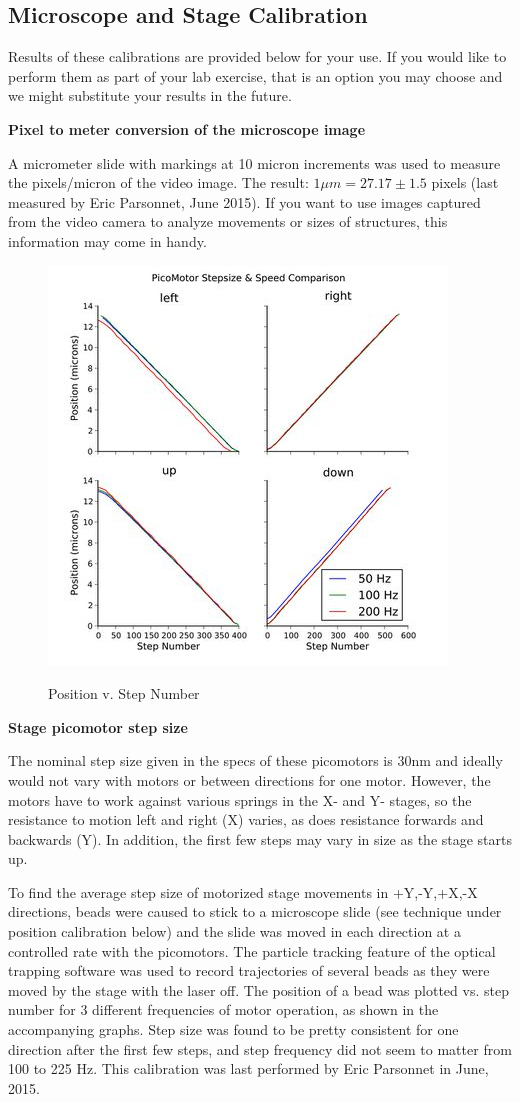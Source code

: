 \documentclass{../lab}
\begin{document}
\subsection{Microscope and Stage Calibration}

Results of these calibrations are provided below for your use. If you would like to perform them as part of your lab exercise, that is an option you may choose and we might substitute your results in the future.

\textbf{Pixel to meter conversion of the microscope image}

A micrometer slide with markings at 10 micron increments was used to measure the pixels/micron of the video image. The result: $1\mu m = 27.17 \pm 1.5$ pixels (last measured by Eric Parsonnet, June 2015). If you want to use images captured from the video camera to analyze movements or sizes of structures, this information may come in handy.

\begin{figure}[h]
    \centering
    \href{http://experimentationlab.berkeley.edu/sites/default/files/images/400px-Stepsize-ayars.jpg}{\includegraphics[width=0.5\linewidth]{images/400px-Stepsize-ayars.jpg}}
    \caption{Position v. Step Number}
    \label{fig:400px-Stepsize-ayars}
\end{figure}

\textbf{Stage picomotor step size}

The nominal step size given in the specs of these picomotors is 30nm and ideally would not vary with motors or between directions for one motor. However, the motors have to work against various springs in the X- and Y- stages, so the resistance to motion left and right (X) varies, as does resistance forwards and backwards (Y). In addition, the first few steps may vary in size as the stage starts up.

To find the average step size of motorized stage movements in +Y,-Y,+X,-X directions, beads were caused to stick to a microscope slide (see technique under position calibration below) and the slide was moved in each direction at a controlled rate with the picomotors. The particle tracking feature of the optical trapping software was used to record trajectories of several beads as they were moved by the stage with the laser off. The position of a bead was plotted vs. step number for 3 different frequencies of motor operation, as shown in the accompanying graphs. Step size was found to be pretty consistent for one direction after the first few steps, and step frequency did not seem to matter from 100 to 225 Hz. This calibration was last performed by Eric Parsonnet in June, 2015.
\end{document}
